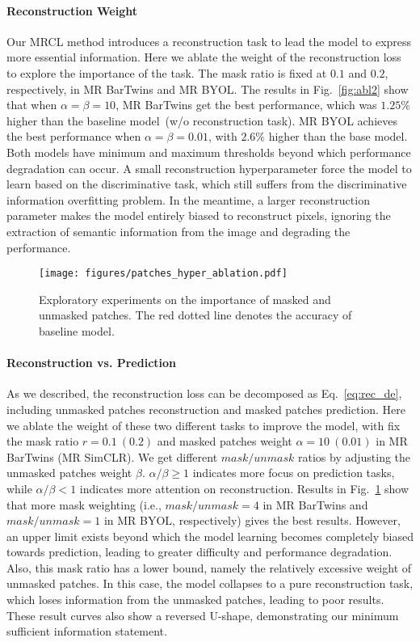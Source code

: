 \documentclass[10pt,twocolumn,letterpaper]{article}
\begin{document}
\paragraph{Reconstruction Weight}
Our MRCL method introduces a reconstruction task to lead the model to express more essential information. Here we ablate the weight of the reconstruction loss to explore the importance of the task. The mask ratio is fixed at $0.1$ and $0.2$, respectively, in MR BarTwins and MR BYOL. The results in Fig.~\ref{fig:abl2} show that when $\alpha=\beta=10$, MR BarTwins get the best performance, which was $1.25\%$ higher than the baseline model~(w/o reconstruction task). MR BYOL achieves the best performance when $\alpha=\beta=0.01$, with $2.6\%$ higher than the base model. Both models have minimum and maximum thresholds beyond which performance degradation can occur. A small reconstruction hyperparameter force the model to learn based on the discriminative task, which still suffers from the discriminative information overfitting problem. In the meantime, a larger reconstruction parameter makes the model entirely biased to reconstruct pixels, ignoring the extraction of semantic information from the image and degrading the performance.

\begin{figure}[h!]
    \centering
    \texttt{[image: figures/patches\_hyper\_ablation.pdf]}
    \caption{Exploratory experiments on the importance of masked and unmasked patches. The red dotted line denotes the accuracy of baseline model.}
    \label{fig:abl3}
\end{figure}
\paragraph{Reconstruction vs. Prediction}
As we described, the reconstruction loss can be decomposed as Eq.~\eqref{eq:rec_de}, including unmasked patches reconstruction and masked patches prediction. Here we ablate the weight of these two different tasks to improve the model, with fix the mask ratio $r=0.1~(0.2)$ and masked patches weight $\alpha=10~(0.01)$ in MR BarTwins (MR SimCLR). We get different $mask/unmask$ ratios by adjusting the unmasked patches weight $\beta$. $\alpha/\beta\ge 1$ indicates more focus on prediction tasks, while $\alpha/\beta < 1$ indicates more attention on reconstruction.
Results in Fig.~\ref{fig:abl3} show that more mask weighting (i.e., $mask/unmask=4$ in MR BarTwins and $mask/unmask=1$ in MR BYOL, respectively) gives the best results. However, an upper limit exists beyond which the model learning becomes completely biased towards prediction, leading to greater difficulty and performance degradation. Also, this mask ratio has a lower bound, namely the relatively excessive weight of unmasked patches. In this case, the model collapses to a pure reconstruction task, which loses information from the unmasked patches, leading to poor results. These result curves also show a reversed U-shape, demonstrating our minimum sufficient information statement.
\end{document}
